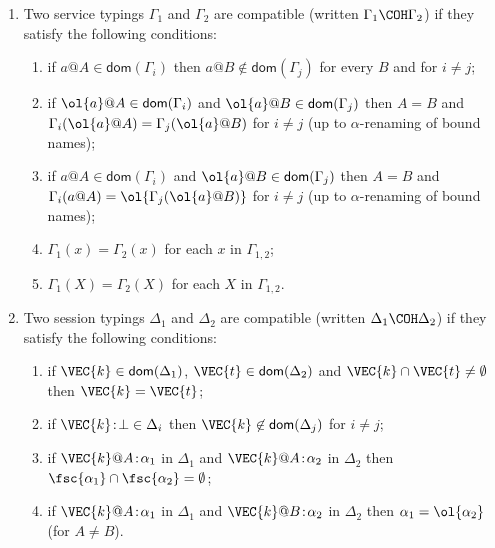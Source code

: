   \begin{enumerate}
  \item Two service typings $\Gamma_1$ and $\Gamma_2$ are compatible
    (written $\Gamma_1\COH\Gamma_2$) if they satisfy the following
    conditions:
      \begin{enumerate}

      \item if $a@A\in\textsf{dom}(\Gamma_i)$ then
        $a@B\not\in\textsf{dom}(\Gamma_{j})$ for
        every $B$ and for $i \neq j$;

      \item if $\ol{a}@A\in\textsf{dom}(\Gamma_{i})$ and
        $\ol{a}@B\in\textsf{dom}(\Gamma_{j})$ then $A=B$ and
        $\Gamma_i(\ol{a}@A)=\Gamma_{j}(\ol{a}@B)$ for $i \neq j$ (up
        to $\alpha$-renaming of bound names);

      \item if $a@A\in\textsf{dom}(\Gamma_i)$ and
        $\ol{a}@B\in\textsf{dom}(\Gamma_{j})$ then
        $A=B$ and $\Gamma_i({a}@A)= \ol{ \Gamma_{j}( \ol{a}@B) }$ for $i \neq j$  (up to $\alpha$-renaming of bound
        names);
      \item $\Gamma_1(x)=\Gamma_2(x)$ for each $x$ in $\Gamma_{1,2}$;
      \item $\Gamma_1(X)=\Gamma_2(X)$ for each $X$ in $\Gamma_{1,2}$.
      \end{enumerate}

    \item Two session typings $\Delta_1$ and $\Delta_2$ are compatible
      (written $\Delta_1\COH\Delta_2$) if they satisfy the following
      conditions:
      \begin{enumerate}
      \item if $\VEC{k}\in\mathsf{dom}(\Delta_1)$,
        $\VEC{t}\in\mathsf{dom}(\Delta_2)$ and
        $\VEC{k}\cap\VEC{t}\not=\emptyset$ then $\VEC{k}=\VEC{t}$;
      \item if $\VEC{k}\!:\!\bot\in\Delta_i$ then
        $\VEC{k}\not\in\mathsf{dom}({\Delta_{j}})$ for $i \neq j$;
      \item if $\VEC{k}@A\!:\!\alpha_1$ in $\Delta_1$ and
        $\VEC{k}@A\!:\!\alpha_2$ in $\Delta_2$ then
        $\fsc{\alpha_1}\cap\fsc{\alpha_2}=\emptyset$;
      \item if $\VEC{k}@A\!:\!\alpha_1$ in $\Delta_1$ and
        $\VEC{k}@B\!:\!\alpha_2$ in $\Delta_2$ then
        $\alpha_1 = \ol{ \alpha_2 }$ (for $A\not=B$).
      \end{enumerate}



\end{enumerate}
